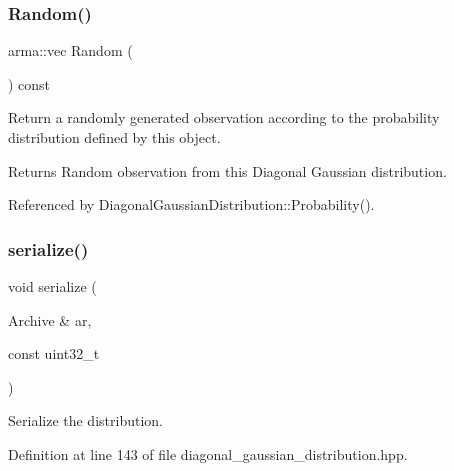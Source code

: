 \subsubsection{Random()}
{\footnotesize\ttfamily arma\+::vec Random (\begin{DoxyParamCaption}{ }\end{DoxyParamCaption}) const}



Return a randomly generated observation according to the probability distribution defined by this object. 

\begin{DoxyReturn}{Returns}
Random observation from this Diagonal Gaussian distribution. 
\end{DoxyReturn}


Referenced by Diagonal\+Gaussian\+Distribution\+::\+Probability().

\mbox{\label{classmlpack_1_1distribution_1_1DiagonalGaussianDistribution_a65cba07328997659bec80b9879b15a51}} 
\subsubsection{serialize()}
{\footnotesize\ttfamily void serialize (\begin{DoxyParamCaption}\item[{Archive \&}]{ar,  }\item[{const uint32\+\_\+t}]{ }\end{DoxyParamCaption})\hspace{0.3cm}{\ttfamily [inline]}}



Serialize the distribution. 



Definition at line 143 of file diagonal\+\_\+gaussian\+\_\+distribution.\+hpp.

\mbox{\label{classmlpack_1_1distribution_1_1DiagonalGaussianDistribution_a269c6f8a40ce41a5f7b6d035aef58238}} 
